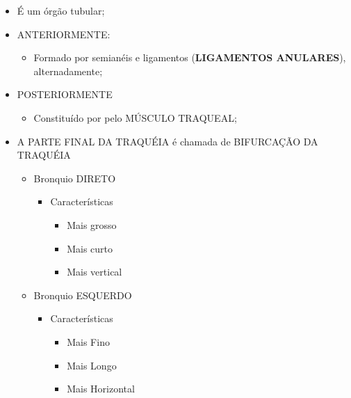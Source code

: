 \documentclass[
]{book}
\providecommand{\tightlist}{%
  \setlength{\itemsep}{0pt}\setlength{\parskip}{0pt}}
\begin{document}
\begin{itemize}
\tightlist
\item
  É um órgão tubular;
\item
  ANTERIORMENTE:

  \begin{itemize}
  \tightlist
  \item
    Formado por semianéis e ligamentos (\textbf{LIGAMENTOS ANULARES}), alternadamente;
  \end{itemize}
\item
  POSTERIORMENTE

  \begin{itemize}
  \tightlist
  \item
    Constituído por pelo MÚSCULO TRAQUEAL;
  \end{itemize}
\item
  A PARTE FINAL DA TRAQUÉIA é chamada de BIFURCAÇÃO DA TRAQUÉIA

  \begin{itemize}
  \tightlist
  \item
    Bronquio DIRETO

    \begin{itemize}
    \tightlist
    \item
      Características

      \begin{itemize}
      \tightlist
      \item
        Mais grosso
      \item
        Mais curto
      \item
        Mais vertical
      \end{itemize}
    \end{itemize}
  \item
    Bronquio ESQUERDO

    \begin{itemize}
    \tightlist
    \item
      Características

      \begin{itemize}
      \tightlist
      \item
        Mais Fino
      \item
        Mais Longo
      \item
        Mais Horizontal
      \end{itemize}
    \end{itemize}
  \end{itemize}
\end{itemize}
\end{document}
